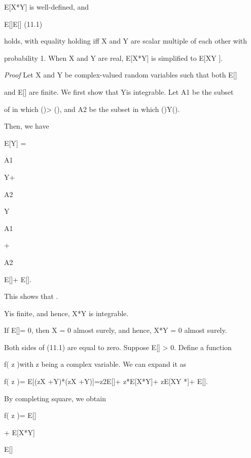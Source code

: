 E[X*Y] is well-defined, and

\vertE[X*Y]\vert \leq

\sqrt

E[\vertX{}]E[\vertY{}] (11.1)

holds, with equality holding iff X and Y are scalar multiple of each other with

probability 1. When X and Y are real, E[X*Y] is simplified to E[XY ].

\textit{Proof} Let X and Y be complex-valued random variables such that both E[\vertX{}]

and E[\vertY{}] are finite. We first show that \vertX*Y\vert is integrable. Let A1 be the subset

of \Omega in which \vertX()\vert > \vertY()\vert, and A2 be the subset in which \vertX()\vert\leq\vert Y()\vert.

Then, we have

E[\vertX*Y\vert] =

\int

A1

\vertX*Y\vert+

\int

A2

\vertX*Y\vert\leq

\int

A1

\vertX{} +

\int

A2

\vertY{} \leq E[\vertX{}]+ E[\vertY{}].

This shows that .

\int

\vertX*Y\vert is finite, and hence, X*Y is integrable.

If E[\vertX{}]= 0, then X = 0 almost surely, and hence, X*Y = 0 almost surely.

Both sides of (11.1) are equal to zero. Suppose E[\vertX{}] > 0. Define a function

f( z ) with z being a complex variable. We can expand it as

f( z )= E[(zX +Y)*(zX +Y)]=\vert z\vert2E[\vertX{}]+ z*E[X*Y]+ zE[XY *]+ E[\vertY{}].

By completing square, we obtain

f( z )= E[\vertX{}]\cdot

\vert\vert\vertz+ E[X*Y]

E[\vertX{}]

